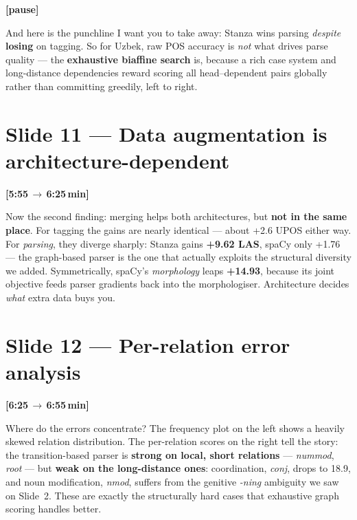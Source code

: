 \documentclass[12pt,a4paper]{article}
\newcommand{\timing}[2]{%
   \par\noindent\textbf{\small [#1\,$\to$\,#2\,min]}\par\vspace{0.2em}}
\newcommand{\say}[1]{\textbf{#1}}
\newcommand{\breathe}{\par\vspace{0.4em}\textbf{[pause]}\par}
\begin{document}
\breathe

And here is the punchline I want you to take away: Stanza wins parsing
\emph{despite} \say{losing} on tagging. So for Uzbek, raw POS accuracy is
\emph{not} what drives parse quality --- the \say{exhaustive biaffine
search} is, because a rich case system and long-distance dependencies
reward scoring all head--dependent pairs globally rather than committing
greedily, left to right.

\section*{Slide 11 --- Data augmentation is architecture-dependent}
\timing{5:55}{6:25}

Now the second finding: merging helps both architectures, but \say{not
in the same place}. For tagging the gains are nearly identical --- about
+2.6 UPOS either way. For \emph{parsing}, they diverge sharply: Stanza
gains \textbf{+9.62 LAS}, spaCy only +1.76 --- the graph-based parser is
the one that actually exploits the structural diversity we added.
Symmetrically, spaCy's \emph{morphology} leaps \textbf{+14.93}, because
its joint objective feeds parser gradients back into the morphologiser.
Architecture decides \emph{what} extra data buys you.

\section*{Slide 12 --- Per-relation error analysis}
\timing{6:25}{6:55}

Where do the errors concentrate? The frequency plot on the left shows a
heavily skewed relation distribution. The per-relation scores on the
right tell the story: the transition-based parser is \say{strong on
local, short relations} --- \textit{nummod}, \textit{root} --- but
\say{weak on the long-distance ones}: coordination, \textit{conj}, drops
to 18.9, and noun modification, \textit{nmod}, suffers from the genitive
\textit{-ning} ambiguity we saw on Slide~2. These are exactly the
structurally hard cases that exhaustive graph scoring handles better.

\end{document}
